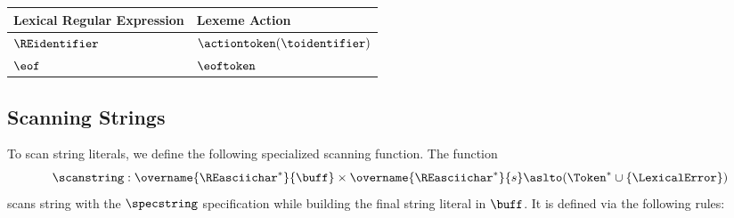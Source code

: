 \begin{center}
\begin{tabular}{ll}
\textbf{Lexical Regular Expression} & \textbf{Lexeme Action}\\
\hline
$\REidentifier$   & $\actiontoken(\toidentifier)$ \\
$\eof$            & $\eoftoken$ \\
\hline
\end{tabular}
\end{center}

\subsection{Scanning Strings}
\hypertarget{def-scanstring}{}
To scan string literals, we define the following specialized scanning function.
The function
\[
\scanstring : \overname{\REasciichar^*}{\buff} \times \overname{\REasciichar^*}{s} \aslto (\Token^* \cup \{\LexicalError\})
\]
scans string with the $\specstring$ specification while building the final string literal in $\buff$.
It is defined via the following rules:
\begin{mathpar}
\end{mathpar}

\begin{mathpar}
\end{mathpar}

\begin{mathpar}
\end{mathpar}

